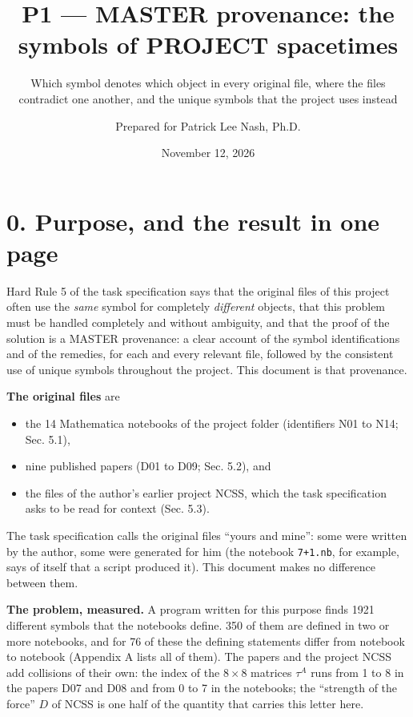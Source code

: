 \documentclass[
  10pt,
]{article}
\title{P1 --- MASTER provenance: the symbols of PROJECT spacetimes}
\subtitle{Which symbol denotes which object in every original file,
where the files contradict one another, and the unique symbols that the
project uses instead}
\author{Prepared for Patrick Lee Nash, Ph.D.}
\date{November 12, 2026}
\providecommand{\tightlist}{%
  \setlength{\itemsep}{0pt}\setlength{\parskip}{0pt}}
\begin{document}
\maketitle

\hypertarget{purpose-and-the-result-in-one-page}{%
\section{0. Purpose, and the result in one
page}\label{purpose-and-the-result-in-one-page}}

Hard Rule 5 of the task specification says that the original files of
this project often use the \emph{same} symbol for completely
\emph{different} objects, that this problem must be handled completely
and without ambiguity, and that the proof of the solution is a MASTER
provenance: a clear account of the symbol identifications and of the
remedies, for each and every relevant file, followed by the consistent
use of unique symbols throughout the project. This document is that
provenance.

\textbf{The original files} are

\begin{itemize}
\tightlist
\item
  the 14 Mathematica notebooks of the project folder (identifiers N01 to
  N14; Sec. 5.1),
\item
  nine published papers (D01 to D09; Sec. 5.2), and
\item
  the files of the author's earlier project NCSS, which the task
  specification asks to be read for context (Sec. 5.3).
\end{itemize}

The task specification calls the original files ``yours and mine'': some
were written by the author, some were generated for him (the notebook
\texttt{7+1.nb}, for example, says of itself that a script produced it).
This document makes no difference between them.

\textbf{The problem, measured.} A program written for this purpose finds
1921 different symbols that the notebooks define. 350 of them are
defined in two or more notebooks, and for 76 of these the defining
statements differ from notebook to notebook (Appendix A lists all of
them). The papers and the project NCSS add collisions of their own: the
index of the \(8\times8\) matrices \(\tau^A\) runs from 1 to 8 in the
papers D07 and D08 and from 0 to 7 in the notebooks; the ``strength of
the force'' \(D\) of NCSS is one half of the quantity that carries this
letter here.
\end{document}
